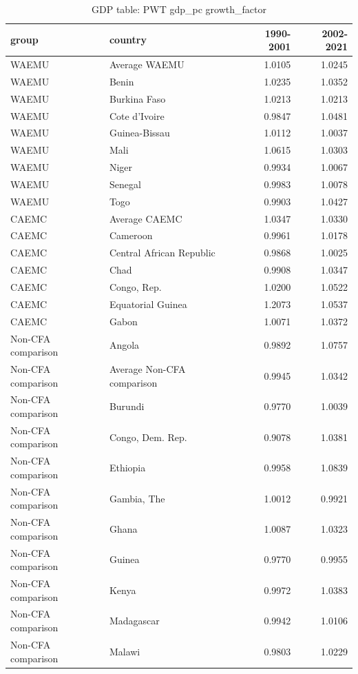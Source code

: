\begin{table}

\caption{GDP table: PWT gdp_pc growth_factor}
\centering
\begin{tabular}[t]{llrr}
\toprule
group & country & 1990-2001 & 2002-2021\\
\midrule
WAEMU & Average WAEMU & 1.0105 & 1.0245\\
WAEMU & Benin & 1.0235 & 1.0352\\
WAEMU & Burkina Faso & 1.0213 & 1.0213\\
WAEMU & Cote d'Ivoire & 0.9847 & 1.0481\\
WAEMU & Guinea-Bissau & 1.0112 & 1.0037\\
\addlinespace
WAEMU & Mali & 1.0615 & 1.0303\\
WAEMU & Niger & 0.9934 & 1.0067\\
WAEMU & Senegal & 0.9983 & 1.0078\\
WAEMU & Togo & 0.9903 & 1.0427\\
CAEMC & Average CAEMC & 1.0347 & 1.0330\\
\addlinespace
CAEMC & Cameroon & 0.9961 & 1.0178\\
CAEMC & Central African Republic & 0.9868 & 1.0025\\
CAEMC & Chad & 0.9908 & 1.0347\\
CAEMC & Congo, Rep. & 1.0200 & 1.0522\\
CAEMC & Equatorial Guinea & 1.2073 & 1.0537\\
\addlinespace
CAEMC & Gabon & 1.0071 & 1.0372\\
Non-CFA comparison & Angola & 0.9892 & 1.0757\\
Non-CFA comparison & Average Non-CFA comparison & 0.9945 & 1.0342\\
Non-CFA comparison & Burundi & 0.9770 & 1.0039\\
Non-CFA comparison & Congo, Dem. Rep. & 0.9078 & 1.0381\\
\addlinespace
Non-CFA comparison & Ethiopia & 0.9958 & 1.0839\\
Non-CFA comparison & Gambia, The & 1.0012 & 0.9921\\
Non-CFA comparison & Ghana & 1.0087 & 1.0323\\
Non-CFA comparison & Guinea & 0.9770 & 0.9955\\
Non-CFA comparison & Kenya & 0.9972 & 1.0383\\
\addlinespace
Non-CFA comparison & Madagascar & 0.9942 & 1.0106\\
Non-CFA comparison & Malawi & 0.9803 & 1.0229\\

\end{tabular}
\end{table}

